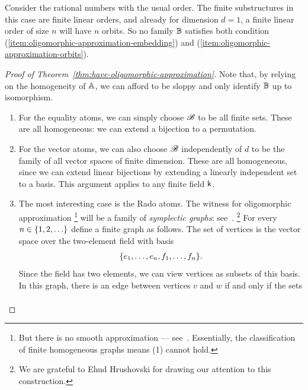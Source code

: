 \begin{non-example}\label{non-ex:weak-smooth-approximation}
Consider the rational numbers with the usual order. The finite substructures in this case are finite linear orders, and already for dimension $d=1$, a finite linear order of size $n$ will have $n$ orbits. 
So no family $\mathbb{B}$ satisfies both condition (\ref{item:oligomorphic-approximation-embedding}) and (\ref{item:oligomorphic-approximation-orbits}).
\end{non-example}

\begin{proof}[Proof of Theorem~\ref{thm:have-oligomorphic-approximation}]
    Note that, by relying on the homogeneity of $\mathbb{A}$, we can afford to be sloppy and only identify $\mathbb{B}$ up to isomorphism. 

    \begin{enumerate}
        \item For the equality atoms, we can simply choose $\mathscr{B}$ to be all finite sets. 
        These are all homogeneous: we can extend a bijection to a permutation.
        \item For the vector atoms, we can also choose $\mathscr{B}$ independently of $d$ to be the family of all vector spaces of finite dimension. 
        These are all homogeneous, since we can extend linear bijections by extending a linearly independent set to a basis. 
        This argument applies to any finite field $\mathsf{k}$.
        \item 
        The most interesting case is the Rado atoms. 
        The witness for oligomorphic approximation%
        \footnote{But there is no smooth approximation --- see~\cite[Rem.~2.1.2]{CherlinHrushovski_03}. 
        Essentially, the classification of finite homogeneous graphs \cite[p.~100]{Gardiner1976} means (1) cannot hold.} 
        will be a family of \emph{symplectic graphs}: see~\cite[Sec.~8.11]{GR01}.%
        \footnote{We are grateful to Ehud Hrushovski for drawing our attention to this construction.} 
        For every $n \in \{1,2,\ldots\}$ define a finite graph as follows. 
        The set of vertices is the vector space over the two-element field with basis 
        \begin{align*}
            \{e_1,\ldots,e_n, f_1,\ldots,f_n\}.
        \end{align*}
        Since the field has two elements, we can view vertices as subsets of this basis. In this graph, there is an edge between vertices $v$ and $w$ if and only if the sets 
        \begin{align*}

\end{align*}
\end{enumerate}
\end{proof}
